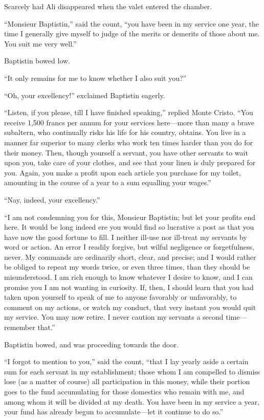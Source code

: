 Scarcely had Ali disappeared when the valet entered the chamber.

“Monsieur Baptistin,” said the count, “you have been in my service one
year, the time I generally give myself to judge of the merits or
demerits of those about me. You suit me very well.”

Baptistin bowed low.

“It only remains for me to know whether I also suit you?”

“Oh, your excellency!” exclaimed Baptistin eagerly.

“Listen, if you please, till I have finished speaking,” replied Monte
Cristo. “You receive 1,500 francs per annum for your services here—more
than many a brave subaltern, who continually risks his life for his
country, obtains. You live in a manner far superior to many clerks who
work ten times harder than you do for their money. Then, though
yourself a servant, you have other servants to wait upon you, take care
of your clothes, and see that your linen is duly prepared for you.
Again, you make a profit upon each article you purchase for my toilet,
amounting in the course of a year to a sum equalling your wages.”

“Nay, indeed, your excellency.”

“I am not condemning you for this, Monsieur Baptistin; but let your
profits end here. It would be long indeed ere you would find so
lucrative a post as that you have now the good fortune to fill. I
neither ill-use nor ill-treat my servants by word or action. An error I
readily forgive, but wilful negligence or forgetfulness, never. My
commands are ordinarily short, clear, and precise; and I would rather
be obliged to repeat my words twice, or even three times, than they
should be misunderstood. I am rich enough to know whatever I desire to
know, and I can promise you I am not wanting in curiosity. If, then, I
should learn that you had taken upon yourself to speak of me to anyone
favorably or unfavorably, to comment on my actions, or watch my
conduct, that very instant you would quit my service. You may now
retire. I never caution my servants a second time—remember that.”

Baptistin bowed, and was proceeding towards the door.

“I forgot to mention to you,” said the count, “that I lay yearly aside
a certain sum for each servant in my establishment; those whom I am
compelled to dismiss lose (as a matter of course) all participation in
this money, while their portion goes to the fund accumulating for those
domestics who remain with me, and among whom it will be divided at my
death. You have been in my service a year, your fund has already begun
to accumulate—let it continue to do so.”

